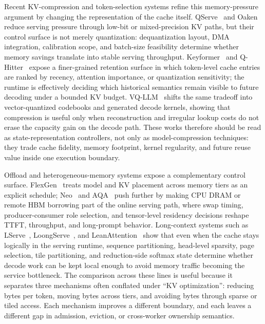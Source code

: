 \documentclass[acmsmall,screen,review]{acmart}
\begin{document}
Recent KV-compression and token-selection systems refine this memory-pressure argument by changing the representation of the cache itself. QServe~\cite{lin2025qserve} and Oaken~\cite{kim2025oaken} reduce serving pressure through low-bit or mixed-precision KV paths, but their control surface is not merely quantization: dequantization layout, DMA integration, calibration scope, and batch-size feasibility determine whether memory savings translate into stable serving throughput. Keyformer~\cite{adnan2024keyformer} and Q-Hitter~\cite{dong2024qhitter} expose a finer-grained retention surface in which token-level cache entries are ranked by recency, attention importance, or quantization sensitivity; the runtime is effectively deciding which historical semantics remain visible to future decoding under a bounded KV budget. VQ-LLM~\cite{liu2025vqllm} shifts the same tradeoff into vector-quantized codebooks and generated decode kernels, showing that compression is useful only when reconstruction and irregular lookup costs do not erase the capacity gain on the decode path. These works therefore should be read as state-representation controllers, not only as model-compression techniques: they trade cache fidelity, memory footprint, kernel regularity, and future reuse value inside one execution boundary.

Offload and heterogeneous-memory systems expose a complementary control surface. FlexGen~\cite{sheng2023flexgen} treats model and KV placement across memory tiers as an explicit schedule; Neo~\cite{jiang2025neo} and AQA~\cite{kumar2025aqa} push further by making CPU DRAM or remote HBM borrowing part of the online serving path, where swap timing, producer-consumer role selection, and tensor-level residency decisions reshape TTFT, throughput, and long-prompt behavior. Long-context systems such as LServe~\cite{yang2025lserve}, LoongServe~\cite{loongserve2024}, and LeanAttention~\cite{sanovar2024leanattention} show that even when the cache stays logically in the serving runtime, sequence partitioning, head-level sparsity, page selection, tile partitioning, and reduction-side softmax state determine whether decode work can be kept local enough to avoid memory traffic becoming the service bottleneck. The comparison across these lines is useful because it separates three mechanisms often conflated under ``KV optimization'': reducing bytes per token, moving bytes across tiers, and avoiding bytes through sparse or tiled access. Each mechanism improves a different boundary, and each leaves a different gap in admission, eviction, or cross-worker ownership semantics.
\end{document}
